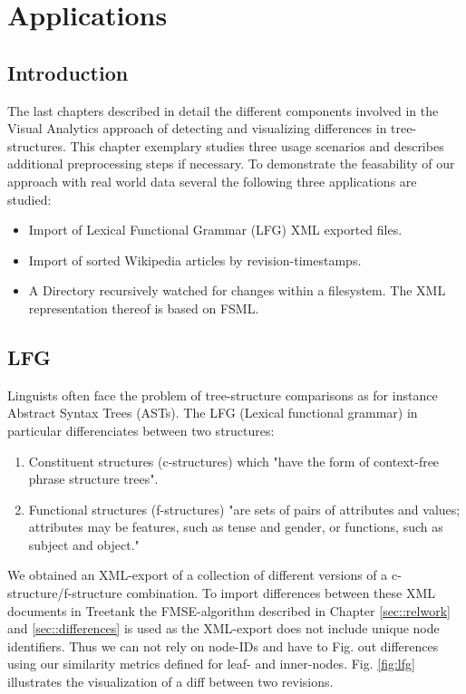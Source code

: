 \section{Applications}\label{sec::applications}
\subsection{Introduction}
The last chapters described in detail the different components involved in the Visual Analytics approach of detecting and visualizing differences in tree-structures. This chapter exemplary studies three usage scenarios and describes additional preprocessing steps if necessary. To demonstrate the feasability of our approach with real world data several the following three applications are studied:

\begin{itemize}
\item Import of Lexical Functional Grammar (LFG) XML exported files.
\item Import of sorted Wikipedia articles by revision-timestamps. 
\item A Directory recursively watched for changes within a filesystem. The XML representation thereof is based on FSML\cite{FSML}. 
\end{itemize}

\subsection{LFG}
Linguists often face the problem of tree-structure comparisons as for instance Abstract Syntax Trees (ASTs). The LFG (Lexical functional grammar) in particular differenciates between two structures:

\begin{enumerate}
\item{Constituent structures (c-structures)} which "have the form of context-free phrase structure trees".
\item{Functional structures (f-structures)} "are sets of pairs of attributes and values; attributes may be features, such as tense and gender, or functions, such as subject and object."\cite{LFG}
\end{enumerate}

We obtained an XML-export of a collection of different versions of a c-structure/f-structure combination. To import differences between these XML documents in Treetank the FMSE-algorithm described in Chapter \ref{sec::relwork} and \ref{sec::differences} is used as the XML-export does not include unique node identifiers. Thus we can not rely on node-IDs and have to Fig. out differences using our similarity metrics defined for leaf- and inner-nodes. Fig. \ref{fig:lfg} illustrates the visualization of a diff between two revisions.

